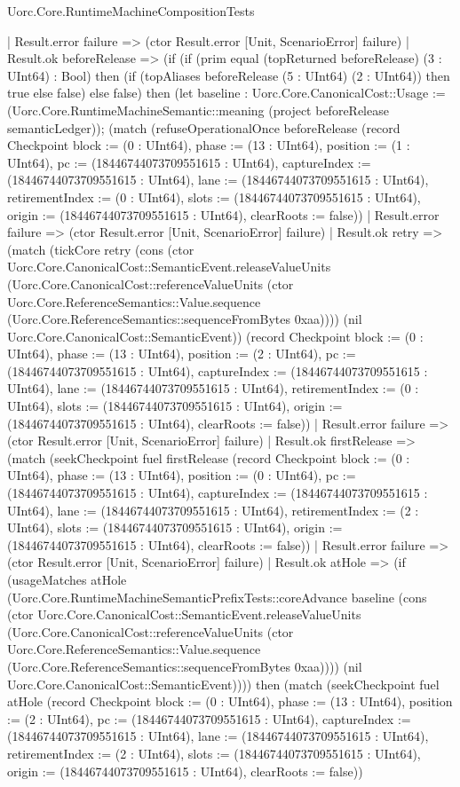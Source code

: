 \begin{lexlean}{Uorc.Core.RuntimeMachineCompositionTests}
\begin{semanticmodule}
{      | Result.error failure => (ctor Result.error [Unit, ScenarioError] failure)
      | Result.ok beforeRelease => (if (if (prim equal (topReturned beforeRelease) (3 : UInt64) : Bool) then (if (topAliases beforeRelease (5 : UInt64) (2 : UInt64)) then true else false) else false) then (let baseline : Uorc.Core.CanonicalCost::Usage := (Uorc.Core.RuntimeMachineSemantic::meaning (project beforeRelease semanticLedger)); (match (refuseOperationalOnce beforeRelease (record Checkpoint {block := (0 : UInt64), phase := (13 : UInt64), position := (1 : UInt64), pc := (18446744073709551615 : UInt64), captureIndex := (18446744073709551615 : UInt64), lane := (18446744073709551615 : UInt64), retirementIndex := (0 : UInt64), slots := (18446744073709551615 : UInt64), origin := (18446744073709551615 : UInt64), clearRoots := false}))
        | Result.error failure => (ctor Result.error [Unit, ScenarioError] failure)
        | Result.ok retry => (match (tickCore retry (cons (ctor Uorc.Core.CanonicalCost::SemanticEvent.releaseValueUnits (Uorc.Core.CanonicalCost::referenceValueUnits (ctor Uorc.Core.ReferenceSemantics::Value.sequence (Uorc.Core.ReferenceSemantics::sequenceFromBytes 0xaa)))) (nil Uorc.Core.CanonicalCost::SemanticEvent)) (record Checkpoint {block := (0 : UInt64), phase := (13 : UInt64), position := (2 : UInt64), pc := (18446744073709551615 : UInt64), captureIndex := (18446744073709551615 : UInt64), lane := (18446744073709551615 : UInt64), retirementIndex := (0 : UInt64), slots := (18446744073709551615 : UInt64), origin := (18446744073709551615 : UInt64), clearRoots := false}))
          | Result.error failure => (ctor Result.error [Unit, ScenarioError] failure)
          | Result.ok firstRelease => (match (seekCheckpoint fuel firstRelease (record Checkpoint {block := (0 : UInt64), phase := (13 : UInt64), position := (0 : UInt64), pc := (18446744073709551615 : UInt64), captureIndex := (18446744073709551615 : UInt64), lane := (18446744073709551615 : UInt64), retirementIndex := (2 : UInt64), slots := (18446744073709551615 : UInt64), origin := (18446744073709551615 : UInt64), clearRoots := false}))
            | Result.error failure => (ctor Result.error [Unit, ScenarioError] failure)
            | Result.ok atHole => (if (usageMatches atHole (Uorc.Core.RuntimeMachineSemanticPrefixTests::coreAdvance baseline (cons (ctor Uorc.Core.CanonicalCost::SemanticEvent.releaseValueUnits (Uorc.Core.CanonicalCost::referenceValueUnits (ctor Uorc.Core.ReferenceSemantics::Value.sequence (Uorc.Core.ReferenceSemantics::sequenceFromBytes 0xaa)))) (nil Uorc.Core.CanonicalCost::SemanticEvent)))) then (match (seekCheckpoint fuel atHole (record Checkpoint {block := (0 : UInt64), phase := (13 : UInt64), position := (2 : UInt64), pc := (18446744073709551615 : UInt64), captureIndex := (18446744073709551615 : UInt64), lane := (18446744073709551615 : UInt64), retirementIndex := (2 : UInt64), slots := (18446744073709551615 : UInt64), origin := (18446744073709551615 : UInt64), clearRoots := false}))
}
\end{semanticmodule}
\end{lexlean}
